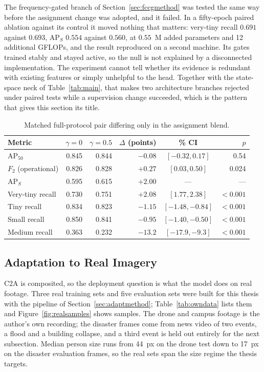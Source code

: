 The frequency-gated branch of Section~\ref{sec:fccgmethod} was tested the same
way before the assignment change was adopted, and it failed. In a fifty-epoch
paired ablation against its control it moved nothing that matters: very-tiny
recall $0.691$ against $0.693$, $\mathrm{AP}_S$ $0.554$ against $0.560$, at
$0.55$~M added parameters and 12 additional GFLOPs, and the result reproduced
on a second machine. Its gates trained stably and stayed active, so the null is
not explained by a disconnected implementation. The experiment cannot tell
whether its evidence is redundant with existing features or simply unhelpful
to the head. Together with the state-space neck of
Table~\ref{tab:main}, that makes two architecture branches rejected under
paired tests while a supervision change succeeded, which is the pattern that
gives this section its title.

\begin{table}[tbp]
  \centering
  \caption{Matched full-protocol pair differing only in the assignment blend.}
  \label{tab:d2pair}
  \small
  \setlength{\tabcolsep}{4.5pt}
  \begin{tabular}{@{}l r r r c r@{}}
    \toprule
    \bfseries\boldmath Metric& \bfseries\boldmath $\gamma=0$& \bfseries\boldmath $\gamma=0.5$& \bfseries\boldmath $\Delta$ (points)& \bfseries\boldmath 95\% CI& \bfseries\boldmath $p$\\
    \midrule
    $\mathrm{AP}_{50}$    & 0.845 & 0.844 & $-0.08$ & $[-0.32, 0.17]$ & 0.54 \\
    $F_2$ (operational)   & 0.826 & 0.828 & $+0.27$ & $[0.03, 0.50]$  & 0.024 \\
    $\mathrm{AP}_S$       & 0.595 & 0.615 & $+2.00$ & --- & --- \\
    Very-tiny recall      & 0.730 & 0.751 & $\mathbf{+2.08}$ & $[1.77, 2.38]$  & $<0.001$ \\
    Tiny recall           & 0.834 & 0.823 & $-1.15$ & $[-1.48, -0.84]$ & $<0.001$ \\
    Small recall          & 0.850 & 0.841 & $-0.95$ & $[-1.40, -0.50]$ & $<0.001$ \\
    Medium recall         & 0.363 & 0.232 & $-13.2$ & $[-17.9, -9.3]$ & $<0.001$ \\
    \bottomrule
  \end{tabular}
\end{table}

\subsection{Adaptation to Real Imagery}
\label{sec:realresults}
C2A is composited, so the deployment question is what the model does on real
footage. Three real training sets and five evaluation sets were built for this
thesis with the pipeline of Section~\ref{sec:adaptmethod};
Table~\ref{tab:owndata} lists them and Figure~\ref{fig:realsamples} shows
samples. The drone and campus footage is the author's own recording; the
disaster frames come from news video of two events, a flood and a building
collapse, and a third event is held out entirely for the next subsection.
Median person size runs from 44~px on the drone test down to 17~px on the
disaster evaluation frames, so the real sets span the size regime the thesis
targets.

